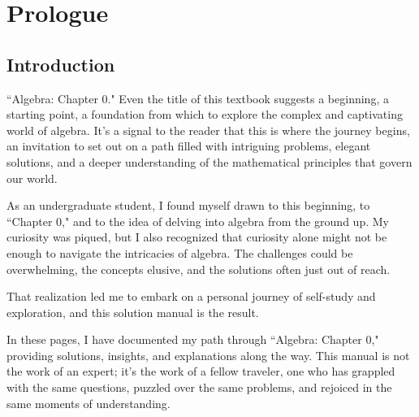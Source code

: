 \newpage
\begin{center}

\end{center}

\chapter*{Prologue}

\section*{Introduction}

``Algebra: Chapter 0." Even the title of this textbook suggests a beginning, a starting point, a foundation from which to explore the complex and captivating world of algebra. It's a signal to the reader that this is where the journey begins, an invitation to set out on a path filled with intriguing problems, elegant solutions, and a deeper understanding of the mathematical principles that govern our world.

As an undergraduate student, I found myself drawn to this beginning, to ``Chapter 0," and to the idea of delving into algebra from the ground up. My curiosity was piqued, but I also recognized that curiosity alone might not be enough to navigate the intricacies of algebra. The challenges could be overwhelming, the concepts elusive, and the solutions often just out of reach.

That realization led me to embark on a personal journey of self-study and exploration, and this solution manual is the result.

In these pages, I have documented my path through ``Algebra: Chapter 0," providing solutions, insights, and explanations along the way. This manual is not the work of an expert; it's the work of a fellow traveler, one who has grappled with the same questions, puzzled over the same problems, and rejoiced in the same moments of understanding.

